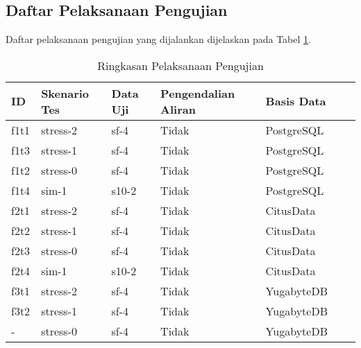 \subsection{Daftar Pelaksanaan Pengujian}

Daftar pelaksanaan pengujian yang dijalankan dijelaskan pada Tabel \ref{tab:execution-summary}.

\begin{table}[H]
    \centering
    \caption{Ringkasan Pelaksanaan Pengujian}
    \label{tab:execution-summary}
    \begin{tabular}{|l|l|l|l|l|l|l|}
        \hline
        \textbf{ID} & \textbf{Skenario Tes} & \textbf{Data Uji} & \textbf{Pengendalian Aliran} & \textbf{Basis Data} \\ \hline
        f1t1        & stress-2              & sf-4              & Tidak                        & PostgreSQL          \\ \hline
        f1t3        & stress-1              & sf-4              & Tidak                        & PostgreSQL          \\ \hline
        f1t2        & stress-0              & sf-4              & Tidak                        & PostgreSQL          \\ \hline
        f1t4        & sim-1                 & s10-2             & Tidak                        & PostgreSQL          \\ \hline
        f2t1        & stress-2              & sf-4              & Tidak                        & CitusData           \\ \hline
        f2t2        & stress-1              & sf-4              & Tidak                        & CitusData           \\ \hline
        f2t3        & stress-0              & sf-4              & Tidak                        & CitusData           \\ \hline
        f2t4        & sim-1                 & s10-2             & Tidak                        & CitusData           \\ \hline
        f3t1        & stress-2              & sf-4              & Tidak                        & YugabyteDB          \\ \hline
        f3t2        & stress-1              & sf-4              & Tidak                        & YugabyteDB          \\ \hline
        -           & stress-0              & sf-4              & Tidak                        & YugabyteDB          \\ \hline

\end{tabular}
\end{table}
